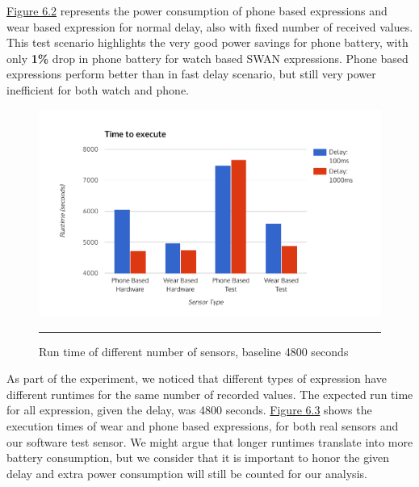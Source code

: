 \hyperref[fig:phone_vs_wear_1000]{Figure 6.2} represents the power consumption of phone based expressions and wear based expression for normal delay, also
with fixed number of received values. This test scenario highlights the very good power savings for phone battery, with only \textbf{1\%} drop in phone battery for watch based SWAN
expressions. Phone based expressions perform better than in fast delay scenario, but still very power inefficient for both watch and phone.

 \begin{figure}[htbp]
  \centering
    \includegraphics[scale=0.8]{Figures/execution_times.pdf}
    \rule{35em}{0.5pt}
  \caption[Run time of different number of sensors, baseline 4800 seconds]{Run time of different number of sensors, baseline 4800 seconds}
  \label{fig:execution_times}
\end{figure}

As part of the experiment, we noticed that different types of expression have different runtimes for the same number of recorded values. The expected run time for all expression,
given the delay, was 4800 seconds. \hyperref[fig:execution_times]{Figure 6.3} shows the execution times of wear and phone based expressions, for both real sensors and our software test sensor.
We might argue that longer runtimes translate into more battery consumption, but we consider that it is important to honor the given delay and extra power consumption will still be counted for 
our analysis.

